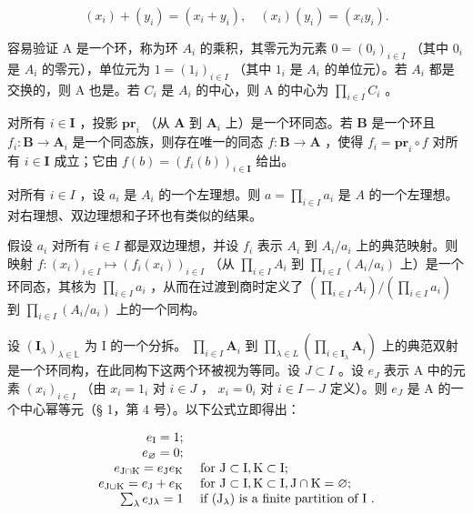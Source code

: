 \[
(x _ {i}) + (y _ {i}) = (x _ {i} + y _ {i}), \quad (x _ {i}) (y _ {i}) = (x _ {i} y _ {i}).\tag{22}
\]

容易验证 A 是一个环，称为环 \(A_{i}\) 的乘积，其零元为元素 \(0 = (0_{i})_{i \in I}\) （其中 \(0_{i}\) 是 \(A_{i}\) 的零元），单位元为 \(1 = (1_{i})_{i \in I}\) （其中 \(1_{i}\) 是 \(A_{i}\) 的单位元）。若 \(A_{i}\) 都是交换的，则 A 也是。若 \(C_{i}\) 是 \(A_{i}\) 的中心，则 A 的中心为 \(\prod_{i \in I} C_{i}\) 。

对所有 \(i \in \mathbf{I}\) ，投影 \(\mathbf{pr}_i\) （从 \(\mathbf{A}\) 到 \(\mathbf{A}_i\) 上）是一个环同态。若 \(\mathbf{B}\) 是一个环且 \(f_i \colon \mathbf{B} \to \mathbf{A}_i\) 是一个同态族，则存在唯一的同态 \(f \colon \mathbf{B} \to \mathbf{A}\) ，使得 \(f_i = \mathbf{pr}_i \circ f\) 对所有 \(i \in \mathbf{I}\) 成立；它由 \(f(b) = (f_i(b))_{i \in \mathbf{I}}\) 给出。

对所有 \(i \in I\) ，设 \(a_i\) 是 \(A_i\) 的一个左理想。则 \(a = \prod_{i \in I} a_i\) 是 \(A\) 的一个左理想。对右理想、双边理想和子环也有类似的结果。

假设 \(a_{i}\) 对所有 \(i \in I\) 都是双边理想，并设 \(f_{i}\) 表示 \(A_{i}\) 到 \(A_{i}/a_{i}\) 上的典范映射。则映射 \(f: (x_{i})_{i \in I} \mapsto (f_{i}(x_{i}))_{i \in I}\) （从 \(\prod_{i \in I} A_{i}\) 到 \(\prod_{i \in I} (A_{i}/a_{i})\) 上）是一个环同态，其核为 \(\prod_{i \in I} a_{i}\) ，从而在过渡到商时定义了 \(\left( \prod_{i \in I} A_{i} \right) / \left( \prod_{i \in I} a_{i} \right)\) 到 \(\prod_{i \in I} (A_{i}/a_{i})\) 上的一个同构。

设 \((\mathbf{I}_{\lambda})_{\lambda \in \mathbb{L}}\) 为 I 的一个分拆。 \(\prod_{i\in I}\mathbf{A}_i\) 到 \(\prod_{\lambda \in L}\left(\prod_{i\in \mathbf{I}_{\lambda}}\mathbf{A}_i\right)\) 上的典范双射是一个环同构，在此同构下这两个环被视为等同。设 \(J\subset I\) 。设 \(e_J\) 表示 A 中的元素 \((x_i)_{i\in I}\) （由 \(x_{i} = 1_{i}\) 对 \(i\in J\) ， \(x_{i} = 0_{i}\) 对 \(i\in I - J\) 定义）。则 \(e_J\) 是 A 的一个中心幂等元（§ 1，第 4 号）。以下公式立即得出：

\[
\begin{array}{r l} e _ {\mathrm{I}} = 1; \\ e _ {\varnothing} = 0; \\ e _ {\mathrm{J} \cap \mathrm{K}} = e _ {\mathrm{J}} e _ {\mathrm{K}} & \text { for   } \mathrm{J} \subset \mathrm{I}, \mathrm{K} \subset \mathrm{I}; \\ e _ {\mathrm{J} \cup \mathrm{K}} = e _ {\mathrm{J}} + e _ {\mathrm{K}} & \text { for   } \mathrm{J} \subset \mathrm{I}, \mathrm{K} \subset \mathrm{I}, \mathrm{J} \cap \mathrm{K} = \varnothing ; \\ \sum_ {\lambda} e _ {\mathrm{J} \lambda} = 1 & \text { if   } (\mathrm{J} _ {\lambda}) \text {   is   a   finite   partition   of   I }. \end{array}
\]


